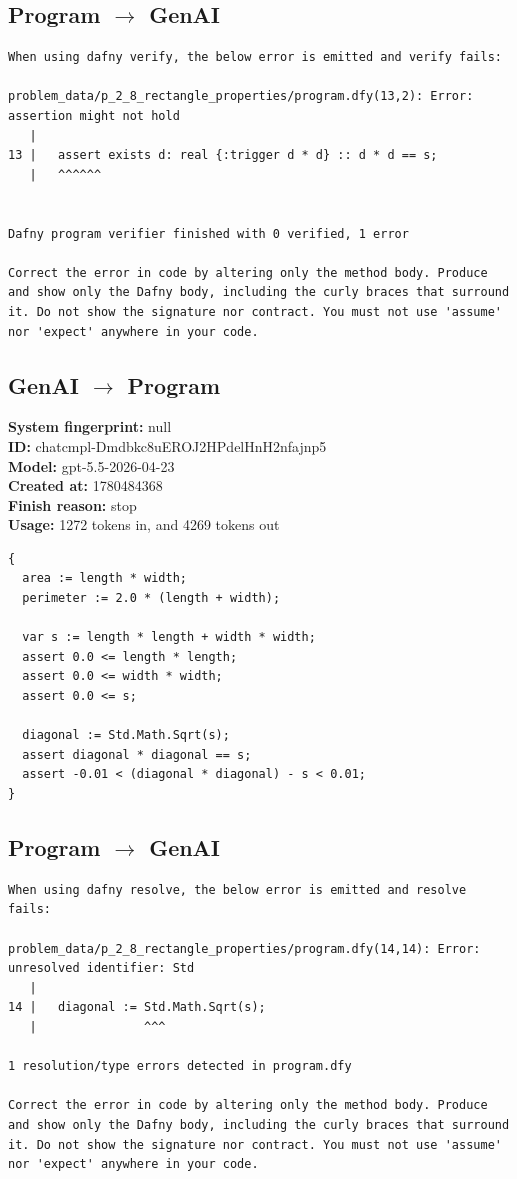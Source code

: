 \documentclass{article}
\begin{document}
\subsection*{Program $\rightarrow$ GenAI}
\begin{lstlisting}
When using dafny verify, the below error is emitted and verify fails:

problem_data/p_2_8_rectangle_properties/program.dfy(13,2): Error: assertion might not hold
   |
13 |   assert exists d: real {:trigger d * d} :: d * d == s;
   |   ^^^^^^


Dafny program verifier finished with 0 verified, 1 error

Correct the error in code by altering only the method body. Produce and show only the Dafny body, including the curly braces that surround it. Do not show the signature nor contract. You must not use 'assume' nor 'expect' anywhere in your code.
\end{lstlisting}
\subsection*{GenAI $\rightarrow$ Program}
\textbf{System fingerprint: }null
\\\textbf{ID: }chatcmpl-Dmdbkc8uEROJ2HPdelHnH2nfajnp5
\\\textbf{Model: }gpt-5.5-2026-04-23
\\\textbf{Created at: }1780484368
\\\textbf{Finish reason: }stop
\\\textbf{Usage: }1272 tokens in, and 4269 tokens out
\begin{lstlisting}
{
  area := length * width;
  perimeter := 2.0 * (length + width);

  var s := length * length + width * width;
  assert 0.0 <= length * length;
  assert 0.0 <= width * width;
  assert 0.0 <= s;

  diagonal := Std.Math.Sqrt(s);
  assert diagonal * diagonal == s;
  assert -0.01 < (diagonal * diagonal) - s < 0.01;
}
\end{lstlisting}
\subsection*{Program $\rightarrow$ GenAI}
\begin{lstlisting}
When using dafny resolve, the below error is emitted and resolve fails:

problem_data/p_2_8_rectangle_properties/program.dfy(14,14): Error: unresolved identifier: Std
   |
14 |   diagonal := Std.Math.Sqrt(s);
   |               ^^^

1 resolution/type errors detected in program.dfy

Correct the error in code by altering only the method body. Produce and show only the Dafny body, including the curly braces that surround it. Do not show the signature nor contract. You must not use 'assume' nor 'expect' anywhere in your code.
\end{lstlisting}
\end{document}
